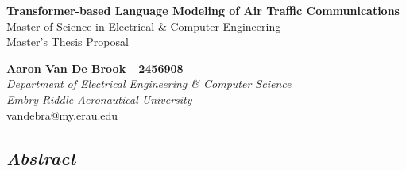 \documentclass[10pt]{article}
\begin{document}
    \begin{center}
        \LARGE
        \textbf{Transformer-based Language Modeling of Air Traffic Communications}\\
        \Large
        Master of Science in Electrical \& Computer Engineering\\
        Master's Thesis Proposal\\

        \vspace*{0.25in}

        \normalsize
        \textbf{Aaron Van De Brook---2456908}\\
        \textit{Department of Electrical Engineering \& Computer Science}\\
        \textit{Embry-Riddle Aeronautical University}\\
        vandebra@my.erau.edu
    \end{center}

    \begin{center}
        \section*{\textit{Abstract}}
        \noindent
        \justifying
        \textit{
            \lipsum[1]
        }
    \end{center}

\end{document}
